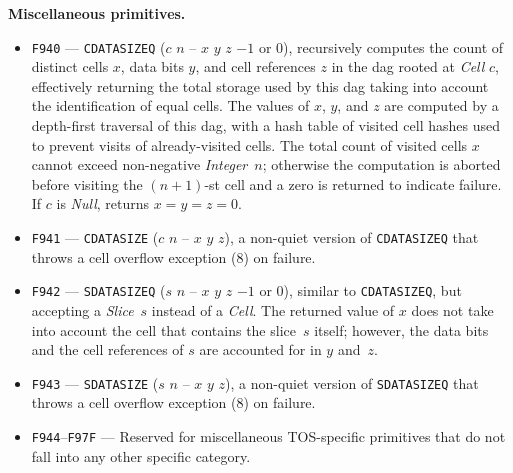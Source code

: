 \documentclass[12pt,oneside]{article}
\def\makepoint#1{\medbreak\noindent{\bf #1.\ }}
\def\nxsubpoint{\refstepcounter{subsubsection}%
  \smallbreak\makepoint{\thesubsubsection}}
\def\emb#1{\textbf{#1.}}
\begin{document}
\nxsubpoint\emb{Miscellaneous primitives}
\begin{itemize}
\item {\tt F940} --- {\tt CDATASIZEQ} ($c$ $n$ -- $x$ $y$ $z$ $-1$ or $0$), recursively computes the count of distinct cells $x$, data bits $y$, and cell references $z$ in the dag rooted at {\em Cell\/} $c$, effectively returning the total storage used by this dag taking into account the identification of equal cells. The values of $x$, $y$, and $z$ are computed by a depth-first traversal of this dag, with a hash table of visited cell hashes used to prevent visits of already-visited cells. The total count of visited cells $x$ cannot exceed non-negative {\em Integer\/}~$n$; otherwise the computation is aborted before visiting the $(n+1)$-st cell and a zero is returned to indicate failure. If $c$ is {\em Null}, returns $x=y=z=0$.
\item {\tt F941} --- {\tt CDATASIZE} ($c$ $n$ -- $x$ $y$ $z$), a non-quiet version of {\tt CDATASIZEQ} that throws a cell overflow exception (8) on failure.
\item {\tt F942} --- {\tt SDATASIZEQ} ($s$ $n$ -- $x$ $y$ $z$ $-1$ or $0$), similar to {\tt CDATASIZEQ}, but accepting a {\em Slice\/}~$s$ instead of a {\em Cell\/}. The returned value of $x$ does not take into account the cell that contains the slice~$s$ itself; however, the data bits and the cell references of $s$ are accounted for in $y$ and~$z$.
\item {\tt F943} --- {\tt SDATASIZE} ($s$ $n$ -- $x$ $y$ $z$), a non-quiet version of {\tt SDATASIZEQ} that throws a cell overflow exception (8) on failure.
\item {\tt F944}--{\tt F97F} --- Reserved for miscellaneous TOS-specific primitives that do not fall into any other specific category.
\end{itemize}
\end{document}
